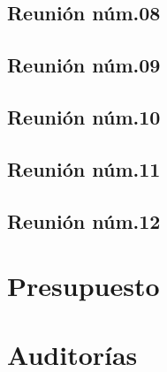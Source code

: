 \documentclass[10pt,spanish]{article}
\let\stdsection\section
\renewcommand\section{\newpage\stdsection}
\begin{document}
\subsection{Reunión núm.08}


\subsection{Reunión núm.09}


\subsection{Reunión núm.10}


\subsection{Reunión núm.11}
%

\subsection{Reunión núm.12}



\section{Presupuesto}
%


\section{Auditorías}


\end{document}
